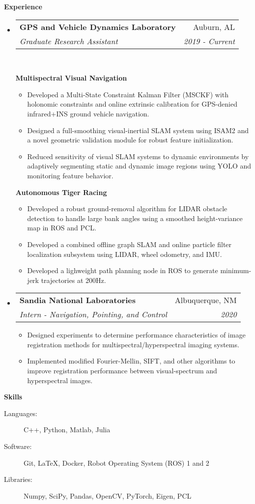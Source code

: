 \documentclass[letterpaper,11pt]{article}
\makeatletter
\newcommand{\resitem}[1]{\item #1 \vspace{-2pt}}
\newcommand{\resheading}[1]{\vspace{10pt} \Large \textbf{#1} \normalsize}
\newcommand{\ressubheading}[4]{
\begin{tabular*}{6.5in}{l@{\extracolsep{\fill}}r}
		\large \textbf{#1} \normalsize & #2 \\
		\textit{#3} & \textit{#4} \\
\end{tabular*}\vspace{-5pt}}
\makeatother
\begin{document}
\resheading{Experience}
\begin{itemize}

\item
	\ressubheading{GPS and Vehicle Dynamics Laboratory}{Auburn, AL}{Graduate Research Assistant}{2019 - Current}\\
	\vspace{10pt}

	\large \textbf{Multispectral Visual Navigation} \normalsize
	\vspace{-5pt}
	\begin{itemize}
		\resitem{Developed a Multi-State Constraint Kalman Filter (MSCKF) with holonomic constraints and online extrinsic calibration for GPS-denied infrared+INS ground vehicle navigation.}
		\resitem{Designed a full-smoothing visual-inertial SLAM system using ISAM2 and a novel geometric validation module for robust feature initialization.}
		\resitem{Reduced sensitivity of visual SLAM systems to dynamic environments by adaptively segmenting static and dynamic image regions using YOLO and monitoring feature behavior.}
	\end{itemize}

	\large \textbf{Autonomous Tiger Racing} \normalsize
	\vspace{-5pt}
	\begin{itemize}
		\resitem{Developed a robust ground-removal algorithm for LIDAR obstacle detection to handle large bank angles using a smoothed height-variance map in ROS and PCL.}
		\resitem{Developed a combined offline graph SLAM and online particle filter localization subsystem using LIDAR, wheel odometry, and IMU.}
		\resitem{Developed a lighweight path planning node in ROS to generate minimum-jerk trajectories at 200Hz.}
	\end{itemize}

\item
	\ressubheading{Sandia National Laboratories}{Albuquerque, NM}{Intern - Navigation, Pointing, and Control}{2020}
	\begin{itemize}
		\item Designed experiments to determine performance characteristics of image registration methods for multispectral/hyperspectral imaging systems.
		\item Implemented modified Fourier-Mellin, SIFT, and other algorithms to improve registration performance between visual-spectrum and hyperspectral images.
	\end{itemize}

\end{itemize}

\resheading{Skills}

\begin{description}
\item[Languages:]
C++, Python, Matlab, Julia
\item[Software:]
Git, \LaTeX, Docker, Robot Operating System (ROS) 1 and 2
\item[Libraries:]
Numpy, SciPy, Pandas, OpenCV, PyTorch, Eigen, PCL
\end{description}
\end{document}
